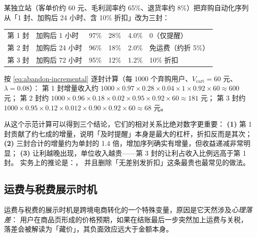 \begin{casebox}
某独立站（客单价约 60 元、毛利润率约 65\%、退货率约 8\%）把弃购自动化序列
从「1 封、加购后 24 小时、含 10\% 折扣」改为三封：

\begin{center}
\small
\begin{tabularx}{\linewidth}{L{1.6cm} L{2.0cm} L{1.6cm} L{1.6cm} L{1.6cm} Y}
\toprule
{} &  &  &  &  &  \\
\midrule
第 1 封 & 加购后 1 小时 & 97\% & 28\% & 4.0\% & 0（仅提醒） \\
第 2 封 & 加购后 24 小时 & 96\% & 18\% & 2.0\% & 免运费（约折 5\%） \\
第 3 封 & 加购后 72 小时 & 95\% & 12\% & 1.2\% & 10\% 折扣 \\
\bottomrule
\end{tabularx}
\label{tab:abandon-sequence}
\end{center}

按 \cref{eq:abandon-incremental} 逐封计算（每 1000 个弃购用户、$V_{\text{cart}} = 60$ 元、$\lambda = 0.08$）：
第 1 封增量收入约 $1000 \times 0.97 \times 0.28 \times 0.04 \times 1 \times 0.92 \times 60 \approx 600$ 元；
第 2 封约 $1000 \times 0.96 \times 0.18 \times 0.02 \times 0.95 \times 0.92 \times 60 \approx 181$ 元；
第 3 封约 $1000 \times 0.95 \times 0.12 \times 0.012 \times 0.90 \times 0.92 \times 60 \approx 68$ 元。

从这个示范计算可以得到三个结论，它们的相对关系比绝对数字更重要：
\textbf{(1)} 第 1 封贡献了约七成的增量，说明「及时提醒」本身是最大的杠杆，折扣反而是其次；
\textbf{(2)} 三封合计的增量约为单封的 1.4 倍，增加序列确实有增量，但收益递减非常明显；
\textbf{(3)} 让利越晚出现，单位收入越贵——第 3 封的让利占收入比例远高于第 1 封。
实务上的推论是：，
并且删除「无差别发折扣」这条最贵也最常见的做法。
\end{casebox}

\subsection{运费与税费展示时机}

运费与税费的展示时机是跨境电商转化的一个特殊变量，原因是它天然涉及\emph{心理落差}：
用户在商品页形成的价格预期，如果在结账最后一步突然加上运费与关税，
落差会被解读为「藏价」，其负面效应远大于金额本身。

